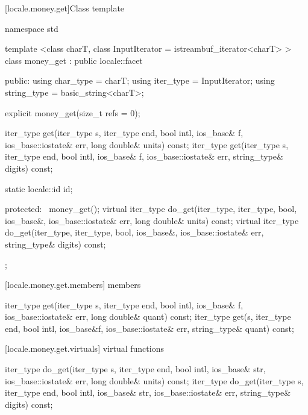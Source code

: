 [locale.money.get]{Class template }

%
\begin{codeblock}
namespace std {
  template <class charT,
    class InputIterator = istreambuf_iterator<charT> >
  class money_get : public locale::facet {
  public:
    using char_type   = charT;
    using iter_type   = InputIterator;
    using string_type = basic_string<charT>;

    explicit money_get(size_t refs = 0);

    iter_type get(iter_type s, iter_type end, bool intl,
                  ios_base& f, ios_base::iostate& err,
                  long double& units) const;
    iter_type get(iter_type s, iter_type end, bool intl,
                  ios_base& f, ios_base::iostate& err,
                  string_type& digits) const;

    static locale::id id;

  protected:
    ~money_get();
    virtual iter_type do_get(iter_type, iter_type, bool, ios_base&,
                             ios_base::iostate& err, long double& units) const;
    virtual iter_type do_get(iter_type, iter_type, bool, ios_base&,
                             ios_base::iostate& err, string_type& digits) const;
  };
}
\end{codeblock}

[locale.money.get.members]{ members}

%
%
\begin{itemdecl}
iter_type get(iter_type s, iter_type end, bool intl,
              ios_base& f, ios_base::iostate& err,
              long double& quant) const;
iter_type get(s, iter_type end, bool intl, ios_base&f,
              ios_base::iostate& err, string_type& quant) const;
\end{itemdecl}

\begin{itemdescr}
\pnum
\returns
{}
\end{itemdescr}

[locale.money.get.virtuals]{ virtual functions}

%
%
\begin{itemdecl}
iter_type do_get(iter_type s, iter_type end, bool intl,
                 ios_base& str, ios_base::iostate& err,
                 long double& units) const;
iter_type do_get(iter_type s, iter_type end, bool intl,
                 ios_base& str, ios_base::iostate& err,
                 string_type& digits) const;
\end{itemdecl}

